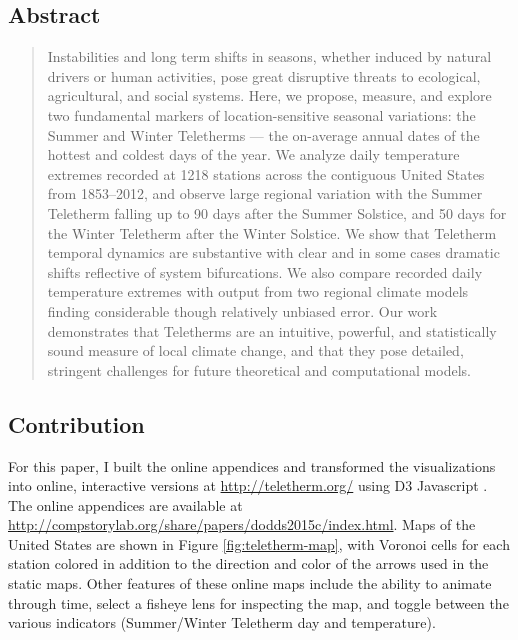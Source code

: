 \subsection{Abstract}
\begin{quote}
  Instabilities and long term shifts in seasons,
  whether induced by natural drivers or human activities,
  pose great disruptive threats to ecological, agricultural, and social systems.
  Here, we propose, measure, and explore two fundamental markers of location-sensitive seasonal variations:
  the Summer and Winter Teletherms
  ---
  the on-average annual dates of the hottest and coldest days of the year.
  We analyze daily temperature extremes recorded at 1218 stations across the contiguous United States
  from 1853--2012,
  and observe large regional variation with the Summer Teletherm falling up to 90 days after the Summer Solstice,
  and 50 days for the Winter Teletherm after the Winter Solstice.
  We show that Teletherm temporal dynamics are substantive
  with clear and in some cases dramatic shifts reflective of system bifurcations.
  We also compare recorded daily temperature extremes
  with output from two regional climate models finding considerable though relatively unbiased error.
  Our work demonstrates that Teletherms are an intuitive, powerful, and statistically sound measure
  of local climate change,
  and that they pose detailed, stringent challenges for future theoretical and computational models.
\end{quote}

\subsection{Contribution}

For this paper,
I built the online appendices and transformed the visualizations into online, interactive versions
at \href{http://teletherm.org/}{http://teletherm.org/} using D3 Javascript \citep{bostock2011d3}.
The online appendices are available at \href{http://compstorylab.org/share/papers/dodds2015c/index.html}{http://compstorylab.org/share/papers/dodds2015c/index.html}.
Maps of the United States are shown in Figure \ref{fig:teletherm-map}, with Voronoi cells for each
station colored in addition to the direction and color of the arrows used in
the static maps.
Other features of these online maps include the ability to animate through time,
select a fisheye lens for inspecting the map, and toggle between the various indicators
(Summer/Winter Teletherm day and temperature).

